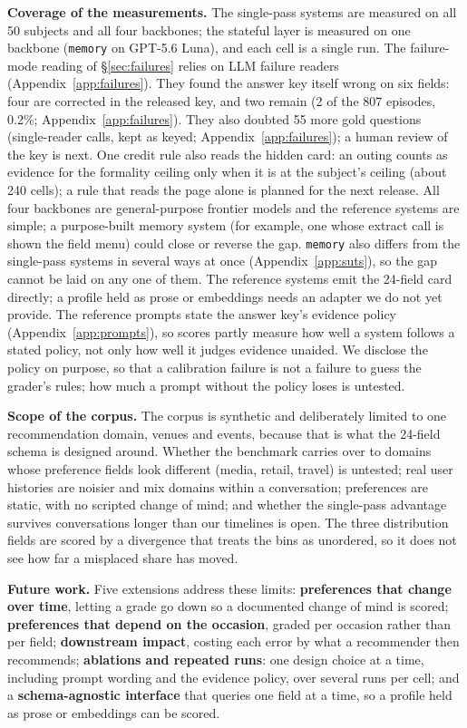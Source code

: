 \documentclass{article}
\begin{document}
\textbf{Coverage of the measurements.} The single-pass systems are measured on all 50 subjects and
all four backbones; the stateful layer is measured on one backbone (\texttt{memory} on GPT-5.6
Luna), and each cell is a single run. The
failure-mode reading of \S\ref{sec:failures} relies on LLM failure readers (Appendix~\ref{app:failures}).
They found the answer key itself wrong on six fields: four are corrected in the released key, and two remain (2 of the 807 episodes, 0.2\%; Appendix~\ref{app:failures}). They also doubted 55 more gold questions (single-reader calls, kept as keyed;
Appendix~\ref{app:failures}); a human review of the key is next. One credit rule also reads the
hidden card: an outing counts as evidence for the formality ceiling only when it is at the
subject's ceiling (about 240 cells); a rule that reads the page alone is planned for the next
release. All four backbones are general-purpose frontier
models and the reference systems are simple; a purpose-built memory system (for example, one whose
extract call is shown the field menu) could close or reverse the gap. \texttt{memory} also differs
from the single-pass systems in several ways at once (Appendix~\ref{app:suts}), so the gap cannot be
laid on any one of them. The reference systems emit the 24-field card directly; a profile held as
prose or embeddings needs an adapter we do not yet provide. The reference
prompts state the answer key's evidence policy (Appendix~\ref{app:prompts}), so scores partly
measure how well a system follows a stated policy, not only how well it judges evidence unaided. We
disclose the policy on purpose, so that a calibration failure is not a failure to guess the grader's
rules; how much a prompt without the policy loses is untested.

\textbf{Scope of the corpus.} The corpus is synthetic and deliberately limited to one recommendation
domain, venues and events, because that is what the 24-field schema is designed around.
Whether the benchmark carries over to domains whose preference fields look different (media,
retail, travel) is untested; real user histories are noisier and mix domains within a conversation;
preferences are static, with no scripted change of mind; and whether the single-pass advantage survives conversations longer than our timelines is open. The
three distribution fields are scored by a divergence that treats the bins as unordered, so it does
not see how far a misplaced share has moved.

\textbf{Future work.}\label{sec:future} Five extensions address these limits:
\textbf{preferences that change over time}, letting a grade go down so a documented change of mind
is scored; \textbf{preferences that depend on the occasion}, graded per occasion rather than per
field; \textbf{downstream impact}, costing each error by what a recommender then recommends;
\textbf{ablations and repeated runs}: one design choice at a time, including prompt wording and
the evidence policy, over several runs per cell; and a
\textbf{schema-agnostic interface} that queries one field at a time, so a profile held as prose or
embeddings can be scored.
\end{document}

